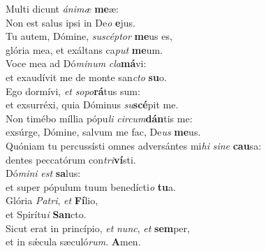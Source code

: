 \evenverse Multi dicunt \textit{á}\textit{ni}\textit{mæ} \textbf{me}æ:~\*\\
\evenverse Non est salus ipsi in De\textit{o} \textbf{e}jus.\\
\oddverse Tu autem, Dómine, \textit{su}\textit{scép}\textit{tor} \textbf{me}us es,~\*\\
\oddverse glória mea, et exáltans ca\textit{put} \textbf{me}um.\\
\evenverse Voce mea ad Dó\textit{mi}\textit{num} \textit{cla}\textbf{má}vi:~\*\\
\evenverse et exaudívit me de monte san\textit{cto} \textbf{su}o.\\
\oddverse Ego dormívi, \textit{et} \textit{so}\textit{po}\textbf{rá}tus sum:~\*\\
\oddverse et exsurréxi, quia Dóminus \textit{su}\textbf{scé}pit me.\\
\evenverse Non timébo míllia pópu\textit{li} \textit{cir}\textit{cum}\textbf{dán}tis me:~\*\\
\evenverse exsúrge, Dómine, salvum me fac, De\textit{us} \textbf{me}us.\\
\oddverse Quóniam tu percussísti omnes adversántes mi\textit{hi} \textit{si}\textit{ne} \textbf{cau}sa:~\*\\
\oddverse dentes peccatórum con\textit{tri}\textbf{ví}sti.\\
\evenverse Dó\textit{mi}\textit{ni} \textit{est} \textbf{sa}lus:~\*\\
\evenverse et super pópulum tuum benedícti\textit{o} \textbf{tu}a.\\
\oddverse Glória \textit{Pa}\textit{tri}, \textit{et} \textbf{Fí}lio,~\*\\
\oddverse et Spirítu\textit{i} \textbf{San}cto.\\
\evenverse Sicut erat in princípio, \textit{et} \textit{nunc}, \textit{et} \textbf{sem}per,~\*\\
\evenverse et in sǽcula sæculó\textit{rum}. \textbf{A}men.\\
